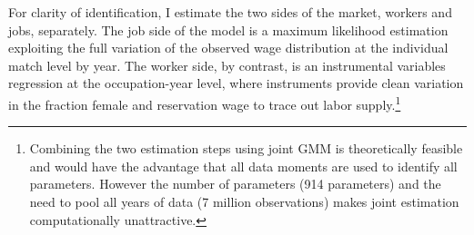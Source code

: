 \documentclass[12pt]{article}
\begin{document}




For clarity of identification, I estimate the two sides of the market, workers and jobs, separately. The job side of the model is a maximum likelihood estimation exploiting the full variation of the observed wage distribution at the individual match level by year. The worker side, by contrast, is an instrumental variables regression at the occupation-year level, where instruments provide clean variation in the fraction female and reservation wage to trace out labor supply.\footnote{Combining the two estimation steps using joint GMM is theoretically feasible and would have the advantage that all data moments are used to identify all parameters. However the number of parameters (914 parameters) and the need to pool all years of data (7 million observations) makes joint estimation computationally unattractive.}
\end{document}
